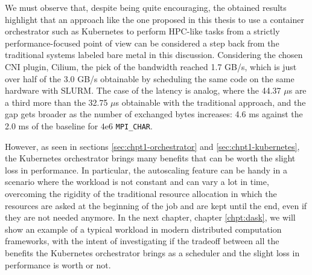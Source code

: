 
We must observe that, despite being quite encouraging, the obtained results
highlight that an approach like the one proposed in this thesis to use a
container orchestrator such as Kubernetes to perform HPC-like tasks from a
strictly performance-focused point of view can be considered a step back from
the traditional systems labeled bare metal in this discussion. Considering the
chosen CNI plugin, Cilium, the pick of the bandwidth reached 1.7 GB/s, which is
just over half of the 3.0 GB/s obtainable by scheduling the same code on the
same hardware with SLURM. The case of the latency is analog, where the 44.37
$\mu$s are a third more than the 32.75 $\mu$s obtainable with the traditional
approach, and the gap gets broader as the number of exchanged bytes increases:
4.6 ms against the 2.0 ms of the baseline for $4\mathrm{e}{6}$
\texttt{MPI\_CHAR}.

However, as seen in sections \ref{sec:chpt1-orchestrator} and
\ref{sec:chpt1-kubernetes}, the Kubernetes orchestrator brings many benefits
that can be worth the slight loss in performance. In particular, the autoscaling
feature can be handy in a scenario where the workload is not constant and can
vary a lot in time, overcoming the rigidity of the traditional resource
allocation in which the resources are asked at the beginning of the job and are
kept until the end, even if they are not needed anymore.  In the next chapter,
chapter \ref{chpt:dask}, we will show an example of a typical workload in modern
distributed computation frameworks, with the intent of investigating if the
tradeoff between all the benefits the Kubernetes orchestrator brings as a
scheduler and the slight loss in performance is worth or not.


